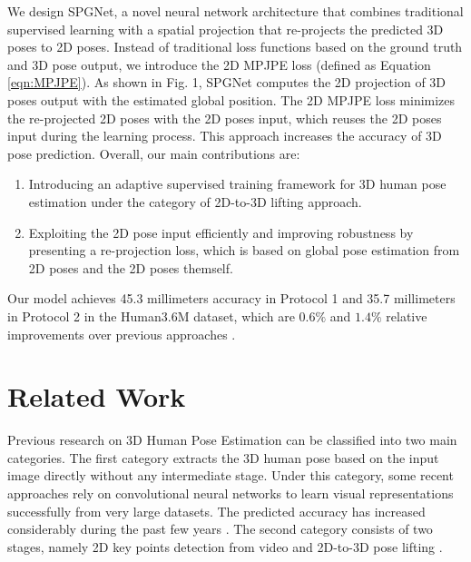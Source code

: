 \documentclass[runningheads]{llncs}
\begin{document}
We design SPGNet, a novel neural network architecture that combines traditional supervised learning with a spatial projection that re-projects the predicted 3D poses to 2D poses. Instead of traditional loss functions based on the ground truth and 3D pose output, we introduce the 2D MPJPE loss (defined as Equation \ref{eqn:MPJPE}). As shown in Fig. 1, SPGNet computes the 2D projection of 3D poses output with the estimated global position. The 2D MPJPE loss minimizes the re-projected 2D poses with the 2D poses input, which reuses the 2D poses input during the learning process. This approach increases the accuracy of 3D pose prediction. Overall, our main contributions are:
\begin{enumerate}
    \item Introducing an adaptive supervised training framework for 3D human pose estimation under the category of 2D-to-3D lifting approach. 
    \item  Exploiting the 2D pose input efficiently and improving robustness by presenting a re-projection loss, which is based on global pose estimation from 2D poses and the 2D poses themself.
\end{enumerate}
Our model achieves 45.3 millimeters accuracy in Protocol 1 and 35.7 millimeters in Protocol 2 in the Human3.6M dataset, which are \(0.6\%\) and \(1.4 \%\) relative improvements over previous approaches \cite{Xu_2020_CVPR}.

\section{Related Work}

Previous research on 3D Human Pose Estimation can be classified into two main categories. The first category extracts the 3D human pose based on the input image directly without any intermediate stage. Under this category, some recent approaches rely on convolutional neural networks to learn visual representations successfully from very large datasets. The predicted accuracy has increased considerably during the past few years \cite{Sun_2018_ECCV,Pavlakos_2017_CVPR}. The second category consists of two stages, namely 2D key points detection from video and 2D-to-3D pose lifting \cite{Chen_2016_CVPR,Pavlakos_2018,MartinezHRL17}.
\end{document}

